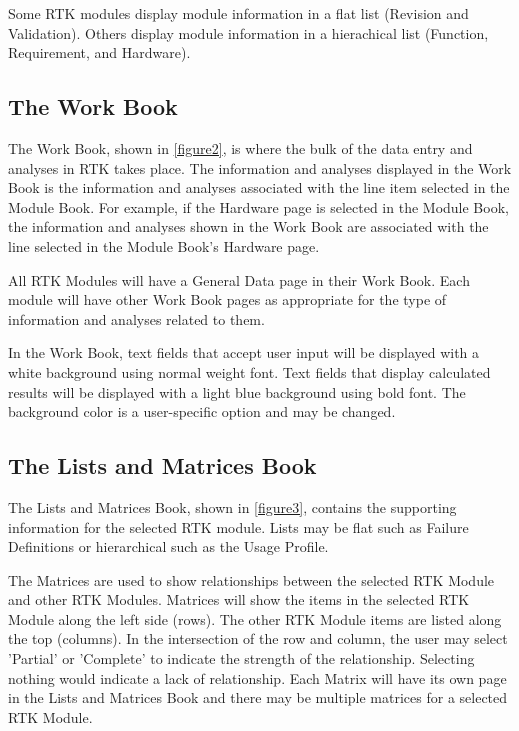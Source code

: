 \documentclass[twoside,12pt,letterpaper,openright]{book}
\begin{document}
\noindent Some RTK modules display module information in a flat list (Revision
and Validation).  Others display module information in a hierachical list
(Function, Requirement, and Hardware).

\subsection{The Work Book}

\noindent The Work Book, shown in \ref{figure2}, is where the bulk of the data
entry and analyses in RTK takes place.  The information and analyses displayed
in the Work Book is the information and analyses associated with the line item
selected in the Module Book.  For example, if the Hardware page is selected in
the Module Book, the information and analyses shown in the Work Book are
associated with the line selected in the Module Book's Hardware page.

\noindent All RTK Modules will have a General Data page in their Work Book.
Each module will have other Work Book pages as appropriate for the type of
information and analyses related to them.

\noindent In the Work Book, text fields that accept user input will be
displayed with a white background using normal weight font.  Text fields that
display calculated results will be displayed with a light blue background using
bold font.  The background color is a user-specific option and may be changed.

\subsection{The Lists and Matrices Book}

\noindent The Lists and Matrices Book, shown in \ref{figure3}, contains the
supporting information for the selected RTK module.  Lists may be flat such as
Failure Definitions or hierarchical such as the Usage Profile.

\noindent The Matrices are used to show relationships between the selected RTK
Module and other RTK Modules.  Matrices will show the items in the selected RTK
Module along the left side (rows).  The other RTK Module items are listed along
the top (columns).  In the intersection of the row and column, the user may
select 'Partial' or 'Complete' to indicate the strength of the relationship.
Selecting nothing would indicate a lack of relationship.  Each Matrix will have
its own page in the Lists and Matrices Book and there may be multiple matrices
for a selected RTK Module.
\end{document}
